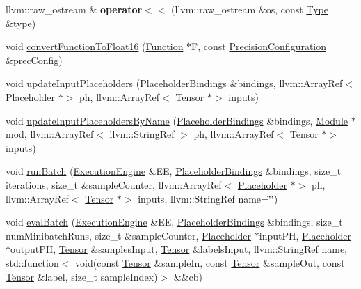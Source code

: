 \begin{DoxyCompactItemize}
llvm\+::raw\+\_\+ostream \& {\bfseries operator$<$$<$} (llvm\+::raw\+\_\+ostream \&os, const \hyperlink{structglow_1_1_type}{Type} \&type)
\item 
void \hyperlink{namespaceglow_aef265ed4d4604e471d8b5662c3f5a423}{convert\+Function\+To\+Float16} (\hyperlink{classglow_1_1_function}{Function} $\ast$F, const \hyperlink{structglow_1_1_precision_configuration}{Precision\+Configuration} \&prec\+Config)
\item 
void \hyperlink{namespaceglow_a24661dfe4d11f5c1cf0db592389a43fc}{update\+Input\+Placeholders} (\hyperlink{classglow_1_1_placeholder_bindings}{Placeholder\+Bindings} \&bindings, llvm\+::\+Array\+Ref$<$ \hyperlink{classglow_1_1_placeholder}{Placeholder} $\ast$$>$ ph, llvm\+::\+Array\+Ref$<$ \hyperlink{classglow_1_1_tensor}{Tensor} $\ast$$>$ inputs)
\item 
void \hyperlink{namespaceglow_afe843dcf46487faf7eecfb58d8e15c04}{update\+Input\+Placeholders\+By\+Name} (\hyperlink{classglow_1_1_placeholder_bindings}{Placeholder\+Bindings} \&bindings, \hyperlink{classglow_1_1_module}{Module} $\ast$mod, llvm\+::\+Array\+Ref$<$ llvm\+::\+String\+Ref $>$ ph, llvm\+::\+Array\+Ref$<$ \hyperlink{classglow_1_1_tensor}{Tensor} $\ast$$>$ inputs)
\item 
void \hyperlink{namespaceglow_a2d7264d309f534807df9015c8bccda87}{run\+Batch} (\hyperlink{classglow_1_1_execution_engine}{Execution\+Engine} \&EE, \hyperlink{classglow_1_1_placeholder_bindings}{Placeholder\+Bindings} \&bindings, size\+\_\+t iterations, size\+\_\+t \&sample\+Counter, llvm\+::\+Array\+Ref$<$ \hyperlink{classglow_1_1_placeholder}{Placeholder} $\ast$$>$ ph, llvm\+::\+Array\+Ref$<$ \hyperlink{classglow_1_1_tensor}{Tensor} $\ast$$>$ inputs, llvm\+::\+String\+Ref name=\char`\"{}\char`\"{})
\item 
void \hyperlink{namespaceglow_ad7385d41afaa1bd063dfa1b74e693ad1}{eval\+Batch} (\hyperlink{classglow_1_1_execution_engine}{Execution\+Engine} \&EE, \hyperlink{classglow_1_1_placeholder_bindings}{Placeholder\+Bindings} \&bindings, size\+\_\+t num\+Minibatch\+Runs, size\+\_\+t \&sample\+Counter, \hyperlink{classglow_1_1_placeholder}{Placeholder} $\ast$input\+PH, \hyperlink{classglow_1_1_placeholder}{Placeholder} $\ast$output\+PH, \hyperlink{classglow_1_1_tensor}{Tensor} \&samples\+Input, \hyperlink{classglow_1_1_tensor}{Tensor} \&labels\+Input, llvm\+::\+String\+Ref name, std\+::function$<$ void(const \hyperlink{classglow_1_1_tensor}{Tensor} \&sample\+In, const \hyperlink{classglow_1_1_tensor}{Tensor} \&sample\+Out, const \hyperlink{classglow_1_1_tensor}{Tensor} \&label, size\+\_\+t sample\+Index)$>$ \&\&cb)
$$
\end{DoxyCompactItemize}
